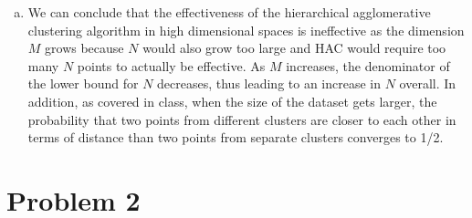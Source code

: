 \documentclass[11pt]{article}
\begin{document}
\begin{enumerate}[a.]
\begin{center}
\end{center}
\item We can conclude that the effectiveness of the hierarchical agglomerative clustering algorithm in high dimensional spaces is ineffective as the dimension $M$ grows because $N$ would also grow too large and HAC would require too many $N$ points to actually be effective. As $M$ increases, the denominator of the lower bound for $N$ decreases, thus leading to an increase in $N$ overall. In addition, as covered in class, when the size of the dataset gets larger, the probability that two points from different clusters are closer to each other in terms of distance than two points from separate clusters converges to 1/2.
\end{enumerate}

\section{Problem 2}
\end{document}
